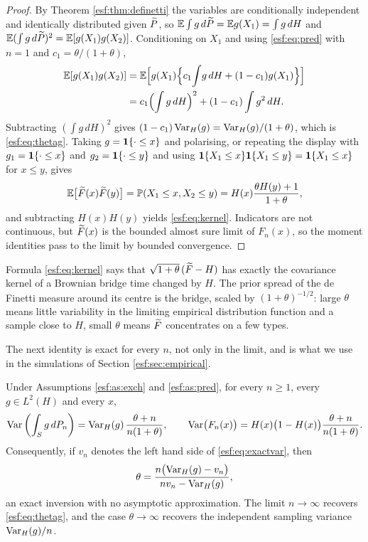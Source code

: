 \begin{proof}
By Theorem \ref{esf:thm:definetti} the variables are conditionally independent and
identically distributed given $\widetilde{P}$, so $\mathbb{E} \int g \, d\widetilde{P} = \mathbb{E} g(X_1) =
\int g \, dH$ and $\mathbb{E} ( \int g \, d\widetilde{P} )^2 = \mathbb{E} [ g(X_1) g(X_2) ]$. Conditioning on
$X_1$ and using \eqref{esf:eq:pred} with $n = 1$ and $c_1 = \theta/(1+\theta)$,
\begin{align*}
\mathbb{E} [ g(X_1) g(X_2) ]
&= \mathbb{E} \Bigl[ g(X_1) \Bigl\{ c_1 \! \int \! g \, dH + (1 - c_1) g(X_1) \Bigr\} \Bigr] \\
&= c_1 \Bigl( \int g \, dH \Bigr)^2 + (1 - c_1) \int g^2 \, dH .
\end{align*}
Subtracting $(\int g \, dH)^2$ gives $(1 - c_1) \operatorname{Var}_H(g) = \operatorname{Var}_H(g)/(1+\theta)$,
which is \eqref{esf:eq:thetag}. Taking $g = \mathbf{1}\{\cdot \le x\}$ and polarising, or repeating
the display with $g_1 = \mathbf{1}\{\cdot \le x\}$ and $g_2 = \mathbf{1}\{\cdot \le y\}$ and using
$\mathbf{1}\{X_1 \le x\} \mathbf{1}\{X_1 \le y\} = \mathbf{1}\{X_1 \le x\}$ for $x \le y$, gives
\[
\mathbb{E} \bigl[ \widetilde{F}(x) \widetilde{F}(y) \bigr] = \mathbb{P}(X_1 \le x, X_2 \le y)
= H(x) \frac{\theta H(y) + 1}{1 + \theta},
\]
and subtracting $H(x) H(y)$ yields \eqref{esf:eq:kernel}. Indicators are not continuous,
but $\widetilde{F}(x)$ is the bounded almost sure limit of $F_n(x)$, so the moment identities
pass to the limit by bounded convergence.
\end{proof}

Formula \eqref{esf:eq:kernel} says that $\sqrt{1+\theta} \, (\widetilde{F} - H)$ has exactly the
covariance kernel of a Brownian bridge time changed by $H$. The prior spread of the de
Finetti measure around its centre is the bridge, scaled by $(1+\theta)^{-1/2}$: large
$\theta$ means little variability in the limiting empirical distribution function and a
sample close to $H$, small $\theta$ means $\widetilde{F}$ concentrates on a few types.

The next identity is exact for every $n$, not only in the limit, and is what we use in
the simulations of Section \ref{esf:sec:empirical}.

\begin{proposition}
\label{esf:prop:exactvar}
Under Assumptions \ref{esf:as:exch} and \ref{esf:as:pred}, for every $n \ge 1$, every
$g \in L^2(H)$ and every $x$,
\begin{equation}
\operatorname{Var} \left( \int_S g \, dP_n \right)
= \operatorname{Var}_H(g) \, \frac{\theta + n}{n (1 + \theta)},
\qquad
\operatorname{Var}\bigl( F_n(x) \bigr) = H(x)\bigl(1 - H(x)\bigr) \frac{\theta+n}{n(1+\theta)} .
\label{esf:eq:exactvar}
\end{equation}
Consequently, if $v_n$ denotes the left hand side of \eqref{esf:eq:exactvar}, then
\begin{equation}
\theta = \frac{n \bigl( \operatorname{Var}_H(g) - v_n \bigr)}{n v_n - \operatorname{Var}_H(g)} ,
\label{esf:eq:thetahat}
\end{equation}
an exact inversion with no asymptotic approximation. The limit $n \to \infty$ recovers
\eqref{esf:eq:thetag}, and the case $\theta \to \infty$ recovers the independent
sampling variance $\operatorname{Var}_H(g)/n$.
\end{proposition}

